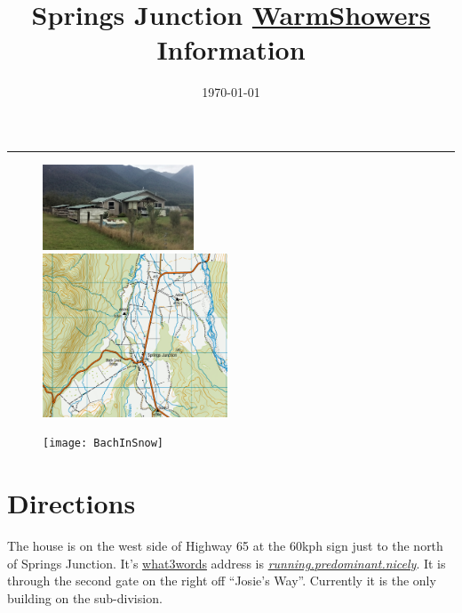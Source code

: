 \documentclass[12pt]{article} %
\title{Springs Junction \href{https://www.warmshowers.org/}{WarmShowers} Information}
\date{\today} %
\makeatletter
\renewcommand{\maketitle}{%
  \begin{center}
    {\bfseries{\scshape{\Large{\@title\par}}}}
  \end{center}
  \medskip
  \begin{flushright}
    {\@date\par}
  \end{flushright}
    \bigskip\hrule\vspace*{2pc}%
}
\makeatother
\begin{document}
  \maketitle

\begin{figure}[t]
\begin{minipage}{.3\linewidth}
\begin{flushleft} 
   \includegraphics[width=4.5cm]{BachPhoto}
\end{flushleft} 
\end{minipage}
\begin{minipage}{.3\linewidth}
\begin{center} 
   \includegraphics[width=5.5cm]{BachLocation}
\end{center} 
\end{minipage}
\hspace{.05\linewidth}
\begin{minipage}{.3\linewidth}
\begin{flushright} 
    \texttt{[image: BachInSnow]}
\end{flushright} 
\end{minipage}
\end{figure}

\section{Directions}
  The house is on the west side of Highway 65 at the 60kph sign just to the north of Springs Junction.  It's \href{https://map.what3words.com}{what3words} address is \textit{\href{https://map.what3words.com/running.predominant.nicely}{running.predominant.nicely}}.  It is through the second gate on the right off ``Josie's Way''.  Currently it is the only building on the sub-division.
\end{document}
